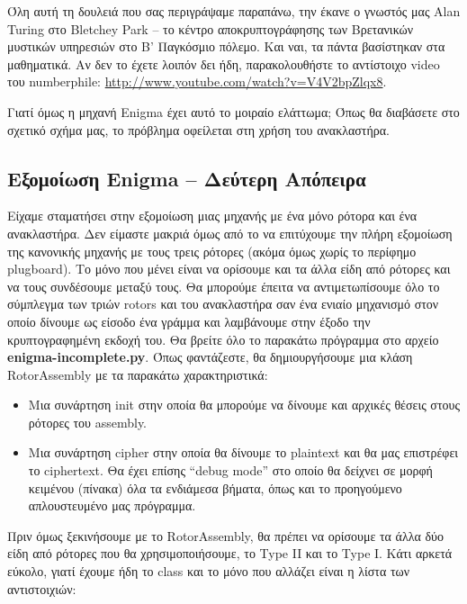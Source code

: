 \documentclass[a4paper,twoside,12pt]{article}
\begin{document}
Όλη αυτή τη δουλειά που σας περιγράψαμε παραπάνω, την έκανε ο γνωστός μας Alan Turing στο Bletchey Park – το κέντρο αποκρυπτογράφησης των Βρετανικών μυστικών υπηρεσιών στο Β' Παγκόσμιο πόλεμο. Και ναι, τα πάντα βασίστηκαν στα μαθηματικά. Αν δεν το έχετε λοιπόν δει ήδη, παρακολουθήστε το αντίστοιχο video του numberphile: \url{http://www.youtube.com/watch?v=V4V2bpZlqx8}.

Γιατί όμως η μηχανή Enigma έχει αυτό το μοιραίο ελάττωμα; Όπως θα διαβάσετε στο σχετικό σχήμα μας, το πρόβλημα οφείλεται στη χρήση του ανακλαστήρα.

\subsection{Εξομοίωση Enigma – Δεύτερη Απόπειρα}

Είχαμε σταματήσει στην εξομοίωση μιας μηχανής με ένα μόνο ρότορα και ένα ανακλαστήρα. Δεν είμαστε μακριά όμως από το να επιτύχουμε την πλήρη εξομοίωση της κανονικής μηχανής με τους τρεις ρότορες (ακόμα όμως χωρίς το περίφημο plugboard). Το μόνο που μένει είναι να ορίσουμε και τα άλλα είδη από ρότορες και να τους συνδέσουμε μεταξύ τους. Θα μπορούμε έπειτα να αντιμετωπίσουμε όλο το σύμπλεγμα των τριών rotors και του ανακλαστήρα σαν ένα ενιαίο μηχανισμό στον οποίο δίνουμε ως είσοδο ένα γράμμα και λαμβάνουμε στην έξοδο την κρυπτογραφημένη εκδοχή του. Θα βρείτε όλο το παρακάτω πρόγραμμα στο αρχείο \textbf{enigma-incomplete.py}. Όπως φαντάζεστε, θα δημιουργήσουμε μια κλάση RotorAssembly με τα παρακάτω χαρακτηριστικά:

\begin{itemize}
\item Μια συνάρτηση init στην οποία θα μπορούμε να δίνουμε και αρχικές θέσεις στους ρότορες του assembly.

\item Μια συνάρτηση cipher στην οποία θα δίνουμε το plaintext και θα μας επιστρέφει το ciphertext. Θα έχει επίσης “debug mode” στο οποίο θα δείχνει σε μορφή κειμένου (πίνακα) όλα τα ενδιάμεσα βήματα, όπως και το προηγούμενο απλουστευμένο μας πρόγραμμα.
\end{itemize}

Πριν όμως ξεκινήσουμε με το RotorAssembly, θα πρέπει να ορίσουμε τα άλλα δύο είδη από ρότορες που θα χρησιμοποιήσουμε, το Type II και το Type I. Κάτι αρκετά εύκολο, γιατί έχουμε ήδη το class και το μόνο που αλλάζει είναι η λίστα των αντιστοιχιών:
\end{document}
